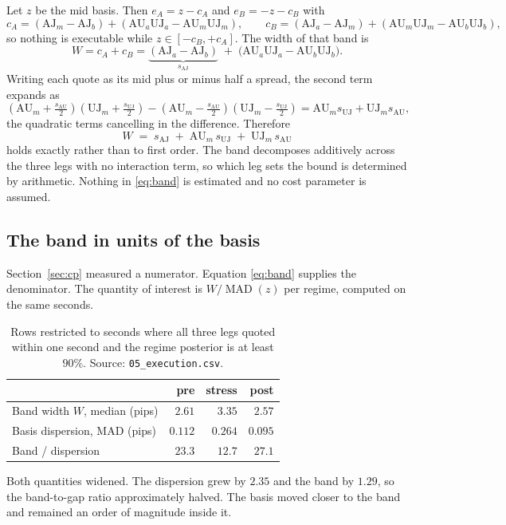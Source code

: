 \documentclass[11pt,a4paper]{article}
\newcommand{\AU}{\mathrm{AU}}
\newcommand{\UJ}{\mathrm{UJ}}
\newcommand{\AJ}{\mathrm{AJ}}
\newcommand{\code}[1]{\texttt{\small #1}}
\begin{document}
Let $z$ be the mid basis. Then $e_A = z - c_A$ and $e_B = -z - c_B$ with
\[
c_A = (\AJ_m - \AJ_b) + (\AU_a \UJ_a - \AU_m \UJ_m), \qquad
c_B = (\AJ_a - \AJ_m) + (\AU_m \UJ_m - \AU_b \UJ_b),
\]
so nothing is executable while $z \in [-c_B, +c_A]$. The width of that band is
\[
W = c_A + c_B = \underbrace{(\AJ_a - \AJ_b)}_{s_{\AJ}}
\;+\; \bigl(\AU_a \UJ_a - \AU_b \UJ_b\bigr).
\]
Writing each quote as its mid plus or minus half a spread, the second term expands as
\[
\left(\AU_m + \tfrac{s_{\AU}}{2}\right)\!\left(\UJ_m + \tfrac{s_{\UJ}}{2}\right)
- \left(\AU_m - \tfrac{s_{\AU}}{2}\right)\!\left(\UJ_m - \tfrac{s_{\UJ}}{2}\right)
= \AU_m s_{\UJ} + \UJ_m s_{\AU},
\]
the quadratic terms cancelling in the difference. Therefore
\begin{equation}
\boxed{\;W \;=\; s_{\AJ} \;+\; \AU_m \, s_{\UJ} \;+\; \UJ_m \, s_{\AU}\;}
\label{eq:band}
\end{equation}
holds exactly rather than to first order. The band decomposes additively across the three
legs with no interaction term, so which leg sets the bound is determined by arithmetic.
Nothing in \eqref{eq:band} is estimated and no cost parameter is assumed.

\subsection{The band in units of the basis}

Section~\ref{sec:cp} measured a numerator. Equation \eqref{eq:band} supplies the
denominator. The quantity of interest is $W / \operatorname{MAD}(z)$ per regime, computed on
the same seconds.

\begin{table}[htbp]
\centering
\small
\begin{tabular}{@{}lrrr@{}}
\toprule
 & pre & stress & post \\
\midrule
Band width $W$, median (pips)      & $2.61$ & $3.35$ & $2.57$ \\
Basis dispersion, MAD (pips)       & $0.112$ & $0.264$ & $0.095$ \\
Band / dispersion                  & $23.3$ & $12.7$ & $27.1$ \\
\bottomrule
\end{tabular}
\caption{Rows restricted to seconds where all three legs quoted within one second and the
regime posterior is at least $90\%$. Source: \code{05\_execution.csv}.}
\end{table}

Both quantities widened. The dispersion grew by $2.35$ and the band by $1.29$, so the
band-to-gap ratio approximately halved. The basis moved closer to the band and remained an
order of magnitude inside it.
\end{document}
